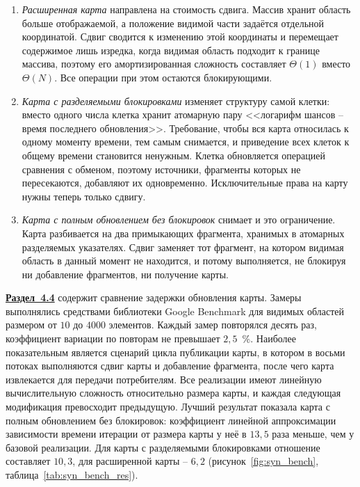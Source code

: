 \begin{enumerate}[beginpenalty=10000]
	\item \emph{Расширенная карта} направлена на стоимость сдвига. Массив хранит область больше отображаемой, а положение видимой части задаётся отдельной координатой. Сдвиг сводится к изменению этой координаты и перемещает содержимое лишь изредка, когда видимая область подходит к границе массива, поэтому его амортизированная сложность составляет $\Theta(1)$ вместо $\Theta(N)$. Все операции при этом остаются блокирующими.
	\item \emph{Карта с разделяемыми блокировками} изменяет структуру самой клетки: вместо одного числа клетка хранит атомарную пару <<логарифм шансов -- время последнего обновления>>. Требование, чтобы вся карта относилась к одному моменту времени, тем самым снимается, и приведение всех клеток к общему времени становится ненужным. Клетка обновляется операцией сравнения с обменом, поэтому источники, фрагменты которых не пересекаются, добавляют их одновременно. Исключительные права на карту нужны теперь только сдвигу.
	\item \emph{Карта с полным обновлением без блокировок} снимает и это ограничение. Карта разбивается на два примыкающих фрагмента, хранимых в атомарных разделяемых указателях. Сдвиг заменяет тот фрагмент, на котором видимая область в данный момент не находится, и потому выполняется, не блокируя ни добавление фрагментов, ни получение карты.
\end{enumerate}

\underline{\textbf{Раздел~4.4}} содержит сравнение задержки обновления карты. Замеры выполнялись средствами библиотеки Google Benchmark для видимых областей размером от $10$ до $4000$ элементов. Каждый замер повторялся десять раз, коэффициент вариации по повторам не превышает $2,5$~\%. Наиболее показательным является сценарий цикла публикации карты, в котором в восьми потоках выполняются сдвиг карты и добавление фрагмента, после чего карта извлекается для передачи потребителям. Все реализации имеют линейную вычислительную сложность относительно размера карты, и каждая следующая модификация превосходит предыдущую. Лучший результат показала карта с полным обновлением без блокировок: коэффициент линейной аппроксимации зависимости времени итерации от размера карты у неё в $13,5$ раза меньше, чем у базовой реализации. Для карты с разделяемыми блокировками отношение составляет $10,3$, для расширенной карты -- $6,2$ (рисунок~\ref{fig:syn_bench}, таблица~\ref{tab:syn_bench_res}).

